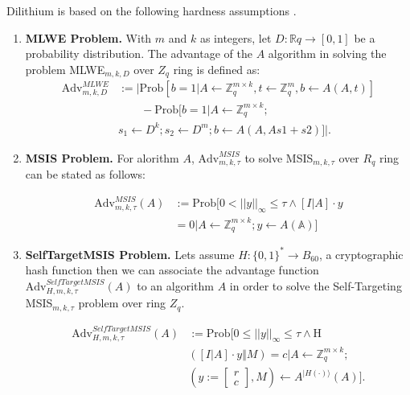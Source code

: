 \documentclass[lettersize,journal]{IEEEtran}
\begin{document}
Dilithium is based on the following hardness assumptions \cite{ducasCRYSTALSDilithiumLatticeBasedDigital2018}.
\begin{enumerate}
    \item \textbf{MLWE Problem.} With $m$ and $k$ as integers, let $D: \mathbb{R}q \rightarrow [0, 1]$ be a probability distribution. The advantage of the $A$ algorithm in solving the problem MLWE$_{m,k,D}$ over $Z_q$ ring is defined as:
    \begin{align*}
        \mathrm{Adv}^{MLWE}_{m,k,D} 
        &:= 
         \vert \mathrm{Prob}
        [b=1 | A \gets \mathbb{Z}_q^{m \times k}, t \gets \mathbb{Z}_q^m, b \gets A(A,t)
        ] 
         \\
        & \qquad - 
        \mathrm{Prob}
        [b=1 | A \gets \mathbb{Z}_q^{m\times k};  \\
        & s_1 \gets D^k; s_2 \gets D^m; b \gets A(A,As1+s2)] \vert. 
    \end{align*}

    \item \textbf{MSIS Problem.} For alorithm $A$, $\mathrm{Adv}^{MSIS}_{m,k,\tau}$ to solve MSIS$_{m,k,\tau}$ over $R_q$ ring can be stated as follows: 
    
    \begin{align*}
    \mathrm{Adv}^{MSIS}_{m,k,\tau}(A) 
    & := \mathrm{Prob}
    [0 < ||y||_{\infty} 
    \leq \tau \wedge [I \vert A] \cdot y  \\
    & = 0 | A \gets \mathbb{Z}_q^{m\times k};y \gets A(\mathbb{A})]
    \end{align*}

    \item \textbf{SelfTargetMSIS Problem.} Lets assume $H : \{0, 1\}^* \rightarrow B_{60}$, a cryptographic hash function then we can associate the advantage function $\mathrm{Adv}^{SelfTargetMSIS}_{H,m,k,\tau}(A)$ to an algorithm $A$ in order to solve the Self-Targeting MSIS$_{m,k,\tau}$ problem over ring $Z_q$.

    \begin{align*}
    \mathrm{Adv}^{SelfTargetMSIS}_{H,m,k,\tau}(A) 
    & := \mathrm{Prob}
    \bigl[0 \leq ||y||_{\infty} \leq \tau \wedge \text{H} \\
    & ([I\vert A]\cdot y\Vert M) = c | A \gets \mathbb{Z}_q^{m\times k};\\
    &\left(y:= \begin{bmatrix} r \\ c \end{bmatrix},M\right) \gets A^{\vert H(\cdot)\rangle}(A)\bigr].
    \end{align*}
\end{enumerate}
\end{document}
